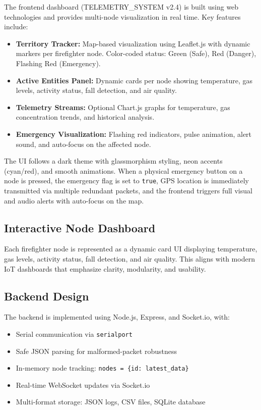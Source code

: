 \documentclass[conference]{IEEEtran}
\begin{document}
	The frontend dashboard (TELEMETRY\_SYSTEM v2.4) is built using web technologies
	and provides multi-node visualization in real time. Key features include:
	
	\begin{itemize}
		\item \textbf{Territory Tracker:} Map-based visualization using Leaflet.js
		with dynamic markers per firefighter node. Color-coded status:
		Green (Safe), Red (Danger), Flashing Red (Emergency).
		\item \textbf{Active Entities Panel:} Dynamic cards per node showing
		temperature, gas levels, activity status, fall detection, and air quality.
		\item \textbf{Telemetry Streams:} Optional Chart.js graphs for temperature,
		gas concentration trends, and historical analysis.
		\item \textbf{Emergency Visualization:} Flashing red indicators, pulse
		animation, alert sound, and auto-focus on the affected node.
	\end{itemize}
	
	The UI follows a dark theme with glassmorphism styling, neon accents (cyan/red),
	and smooth animations. When a physical emergency button on a node is pressed,
	the emergency flag is set to \texttt{true}, GPS location is immediately
	transmitted via multiple redundant packets, and the frontend triggers full visual
	and audio alerts with auto-focus on the map.
	
	\subsection{Interactive Node Dashboard}
	
	Each firefighter node is represented as a dynamic card UI displaying temperature,
	gas levels, activity status, fall detection, and air quality. This aligns with
	modern IoT dashboards that emphasize clarity, modularity, and usability.
	
	\subsection{Backend Design}
	
	The backend is implemented using Node.js, Express, and Socket.io, with:
	\begin{itemize}
		\item Serial communication via \texttt{serialport}
		\item Safe JSON parsing for malformed-packet robustness
		\item In-memory node tracking: \texttt{nodes = \{id: latest\_data\}}
		\item Real-time WebSocket updates via Socket.io
		\item Multi-format storage: JSON logs, CSV files, SQLite database
	\end{itemize}
	
\end{document}
